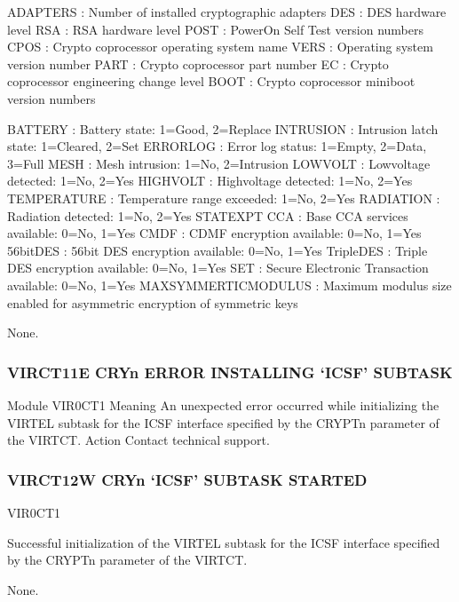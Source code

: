 \documentclass[letterpaper,10pt,english]{sphinxmanual}
\begin{document}
\begin{description}
\sphinxAtStartPar
ADAPTERS : Number of installed cryptographic adapters DES : DES hardware level
RSA : RSA hardware level
POST : Power\sphinxhyphen{}On Self Test version numbers
CP\sphinxhyphen{}OS : Crypto co\sphinxhyphen{}processor operating system name VERS : Operating system version number
PART : Crypto co\sphinxhyphen{}processor part number
EC : Crypto co\sphinxhyphen{}processor engineering change level BOOT : Crypto co\sphinxhyphen{}processor miniboot version numbers

\sphinxAtStartPar
BATTERY : Battery state: 1=Good, 2=Replace INTRUSION : Intrusion latch state: 1=Cleared, 2=Set ERROR\sphinxhyphen{}LOG : Error log status: 1=Empty, 2=Data, 3=Full MESH : Mesh intrusion: 1=No, 2=Intrusion
LOW\sphinxhyphen{}VOLT : Low\sphinxhyphen{}voltage detected: 1=No, 2=Yes HIGH\sphinxhyphen{}VOLT : High\sphinxhyphen{}voltage detected: 1=No, 2=Yes
TEMPERATURE : Temperature range exceeded: 1=No, 2=Yes RADIATION : Radiation detected: 1=No, 2=Yes
STATEXPT
CCA : Base CCA services available: 0=No, 1=Yes CMDF : CDMF encryption available: 0=No, 1=Yes
56\sphinxhyphen{}bit\sphinxhyphen{}DES : 56\sphinxhyphen{}bit DES encryption available: 0=No, 1=Yes Triple\sphinxhyphen{}DES : Triple DES encryption available: 0=No, 1=Yes SET : Secure Electronic Transaction available: 0=No, 1=Yes
MAX\sphinxhyphen{}SYMMERTIC\sphinxhyphen{}MODULUS : Maximum modulus size enabled for asymmetric encryption of symmetric keys

\sphinxAtStartPar
None.

\end{description}


\subsubsection{VIRCT11E CRYn ERROR INSTALLING ‘ICSF’ SUBTASK}
\label{\detokenize{messages:virct11e-cryn-error-installing-icsf-subtask}}
\sphinxAtStartPar
Module
VIR0CT1
Meaning
An unexpected error occurred while initializing the VIRTEL subtask for the ICSF interface specified by the CRYPTn parameter of the VIRTCT.
Action
Contact technical support.


\subsubsection{VIRCT12W CRYn ‘ICSF’ SUBTASK STARTED}
\label{\detokenize{messages:virct12w-cryn-icsf-subtask-started}}\begin{description}
\sphinxAtStartPar
VIR0CT1

\sphinxAtStartPar
Successful initialization of the VIRTEL subtask for the ICSF interface specified by the CRYPTn parameter of the VIRTCT.

\sphinxAtStartPar
None.

\end{description}
\end{document}
